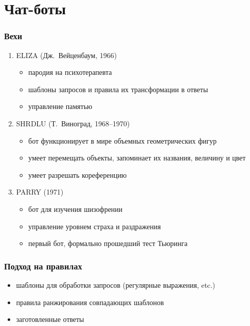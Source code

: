 \section{Чат-боты}

\frame{\tableofcontents[currentsection]}

\begin{frame}
    \frametitle{Вехи}

    \begin{enumerate}
        \item<1-> ELIZA (Дж.~Вейценбаум, 1966) \begin{itemize}
            \item пародия на психотерапевта
            \item шаблоны запросов и правила их трансформации в ответы
            \item управление памятью
        \end{itemize}

        \item<2-> SHRDLU (Т.~Виноград, 1968--1970) \begin{itemize}
            \item бот функционирует в мире объемных геометрических фигур
            \item умеет перемещать объекты, запоминает их названия, величину и цвет
            \item умеет разрешать кореференцию
        \end{itemize}

        \item<3-> PARRY (1971) \begin{itemize}
            \item бот для изучения шизофрении
            \item управление уровнем страха и раздражения
            \item первый бот, формально прошедший тест Тьюринга
        \end{itemize}
    \end{enumerate}
\end{frame}

\begin{frame}
    \frametitle{Подход на правилах}

    \begin{itemize}
        \item шаблоны для обработки запросов (регулярные выражения, etc.)
        \item правила ранжирования совпадающих шаблонов
        \item заготовленные ответы
    \end{itemize}
\end{frame}

